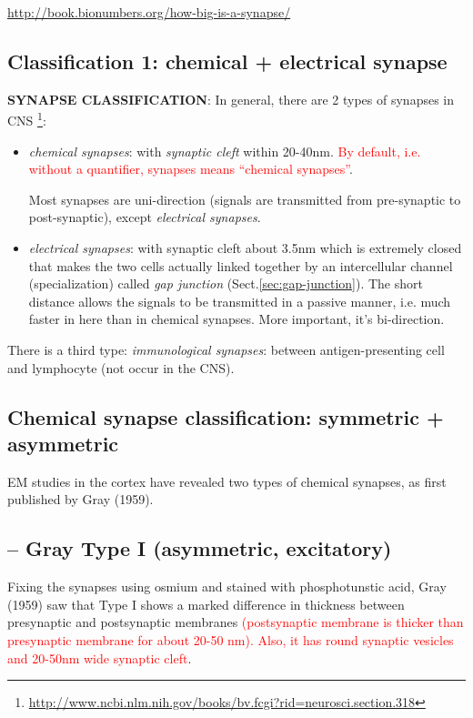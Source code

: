 \url{http://book.bionumbers.org/how-big-is-a-synapse/}


\subsection{Classification 1: chemical + electrical synapse}

{\bf SYNAPSE CLASSIFICATION}: In general, there are 2 types of
synapses in CNS
\footnote{\url{http://www.ncbi.nlm.nih.gov/books/bv.fcgi?rid=neurosci.section.318}}:
\begin{itemize}
\item {\it chemical synapses}: with {\it synaptic cleft} within
  20-40nm.
  \textcolor{red}{By default, i.e. without a quantifier, synapses
    means ``chemical synapses''}.

Most synapses are uni-direction (signals are transmitted from pre-synaptic to
post-synaptic), except {\it electrical synapses}.

\item {\it electrical synapses}: with synaptic cleft about 3.5nm which
  is extremely closed that makes the two cells actually linked together by an
  intercellular channel (specialization) called {\it gap junction}
  (Sect.\ref{sec:gap-junction}). The short distance allows the signals to be
  transmitted in a passive manner, i.e. much faster in here than in chemical
  synapses. More important, it's bi-direction.
  
\end{itemize}
There is a third type: {\it immunological synapses}: between
antigen-presenting cell and lymphocyte (not occur in the CNS).

\subsection{Chemical synapse classification: symmetric + asymmetric}
\label{sec:synapse-symmetric}
\label{sec:synapse-asymmetric}

EM studies in the cortex have revealed two types of chemical synapses, as first
published by Gray (1959).

\subsection{-- Gray Type I (asymmetric, excitatory)}

Fixing the synapses using osmium and stained with phosphotunstic acid, Gray
(1959) saw that Type I shows a marked difference in thickness between
presynaptic and postsynaptic membranes \textcolor{red}{(postsynaptic membrane is
thicker than presynaptic membrane for about 20-50 nm). Also, it has round
synaptic vesicles and 20-50nm wide synaptic cleft}.

